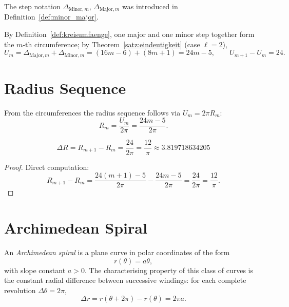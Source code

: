The step notation $\Delta_{\mathrm{Minor},m}$, $\Delta_{\mathrm{Major},m}$ was introduced in Definition~\ref{def:minor_major}.

By Definition~\ref{def:kreisumfaenge}, one major and one minor step
together form the $m$-th circumference; by
Theorem~\ref{satz:eindeutigkeit} (case $\ell = 2$),
\begin{equation}
  U_m = \Delta_{\mathrm{Major},m} + \Delta_{\mathrm{Minor},m}
      = (16m-6) + (8m+1) = 24m - 5,
  \qquad U_{m+1} - U_m = 24.
\end{equation}

\section{Radius Sequence}

From the circumferences the radius sequence follows via $U_m = 2\pi R_m$:
\begin{equation}
  R_m = \frac{U_m}{2\pi} = \frac{24m - 5}{2\pi}.
\end{equation}

\begin{theorem}
\begin{equation}
  \boxed{\Delta R = R_{m+1} - R_m = \frac{24}{2\pi} = \frac{12}{\pi}
  \approx 3.819718634205}
\end{equation}
\end{theorem}

\begin{proof}
Direct computation:
\[
  R_{m+1} - R_m
  = \frac{24(m+1)-5}{2\pi} - \frac{24m-5}{2\pi}
  = \frac{24}{2\pi}
  = \frac{12}{\pi}.
\]
\end{proof}

\section{Archimedean Spiral}

\begin{definition}
An \emph{Archimedean spiral} is a plane curve in polar coordinates
of the form
\[
  r(\theta) = a\theta,
\]
with slope constant $a > 0$. The characterising property of this
class of curves is the constant radial difference between successive
windings: for each complete revolution $\Delta\theta = 2\pi$,
\[
  \Delta r = r(\theta + 2\pi) - r(\theta) = 2\pi a.
\]
\end{definition}

